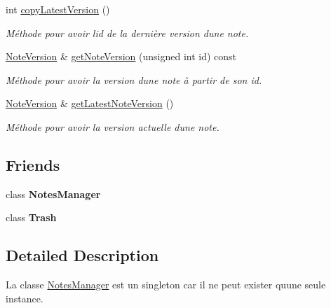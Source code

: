 \begin{DoxyCompactItemize}
\mbox{\label{class_note_a725bfabf6f31b9572c80c94435e2ab41}} 
int \hyperlink{class_note_a725bfabf6f31b9572c80c94435e2ab41}{copy\+Latest\+Version} ()
\begin{DoxyCompactList}\small\item\em Méthode pour avoir l\textquotesingle{}id de la dernière version d\textquotesingle{}une note. \end{DoxyCompactList}\item 
\hyperlink{class_note_version}{Note\+Version} \& \hyperlink{class_note_ae60bb551ea83c20362c3d3ef1f28118c}{get\+Note\+Version} (unsigned int id) const
\begin{DoxyCompactList}\small\item\em Méthode pour avoir la version d\textquotesingle{}une note à partir de son id. \end{DoxyCompactList}\item 
\mbox{\label{class_note_a3331744580a5de2d4c04ade505d675b8}} 
\hyperlink{class_note_version}{Note\+Version} \& \hyperlink{class_note_a3331744580a5de2d4c04ade505d675b8}{get\+Latest\+Note\+Version} ()
\begin{DoxyCompactList}\small\item\em Méthode pour avoir la version actuelle d\textquotesingle{}une note. \end{DoxyCompactList}\end{DoxyCompactItemize}
\subsection*{Friends}
\begin{DoxyCompactItemize}
\item 
\mbox{\label{class_note_a017a5144e8cfa6087305055ab968ef41}} 
class {\bfseries Notes\+Manager}
\item 
\mbox{\label{class_note_aa5b165af6155aa1d6b8c634a27eae73f}} 
class {\bfseries Trash}
\end{DoxyCompactItemize}


\subsection{Detailed Description}
La classe \hyperlink{class_notes_manager}{Notes\+Manager} est un singleton car il ne peut exister qu\textquotesingle{}une seule instance. 

